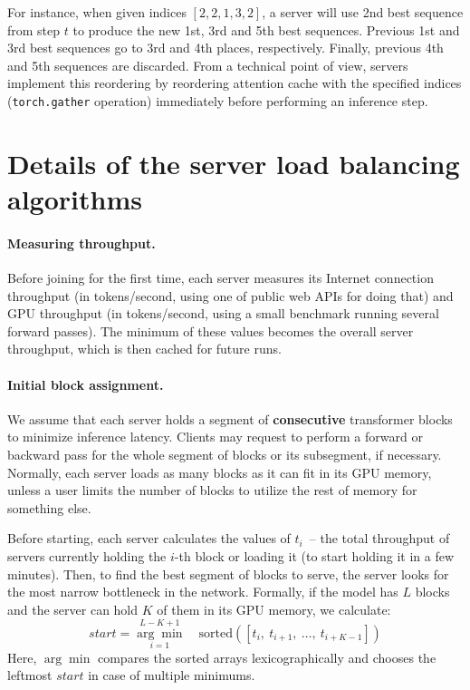 For instance, when given indices $[2, 2, 1, 3, 2]$, a server will use 2nd best sequence from step $t$ to produce the new 1st, 3rd and 5th best sequences. Previous 1st and 3rd best sequences go to 3rd and 4th places, respectively. Finally, previous 4th and 5th sequences are discarded. From a technical point of view, servers implement this reordering by reordering attention cache with the specified indices (\texttt{torch.gather} operation) immediately before performing an inference step.



\section{Details of the server load balancing algorithms}\label{appendix:load_balancing_algo}

\paragraph{Measuring throughput.} Before joining for the first time, each server measures its Internet connection throughput (in tokens/second, using one of public web APIs for doing that) and GPU throughput (in tokens/second, using a small benchmark running several forward passes). The minimum of these values becomes the overall server throughput, which is then cached for future runs.

\paragraph{Initial block assignment.} We assume that each server holds a segment of \textbf{consecutive} transformer blocks to minimize inference latency. Clients may request to perform a forward or backward pass for the whole segment of blocks or its subsegment, if necessary. Normally, each server loads as many blocks as it can fit in its GPU memory, unless a user limits the number of blocks to utilize the rest of memory for something else.

Before starting, each server calculates the values of $t_i$~-- the total throughput of servers currently holding the $i$-th block or loading it (to start holding it in a few minutes). Then, to find the best segment of blocks to serve, the server looks for the most narrow bottleneck in the network. Formally, if the model has $L$ blocks and the server can hold $K$ of them in its GPU memory, we calculate:
\begin{equation}\label{eqn:load_balancing}
start=\underset{i=1}{\overset{L-K+1}{\arg\min}} \quad \mathrm{sorted}([t_i,\ t_{i+1},\ \ldots,\ t_{i+K-1}])
\end{equation}
Here, $\arg\min$ compares the sorted arrays lexicographically and chooses the leftmost $start$ in case of multiple minimums.

